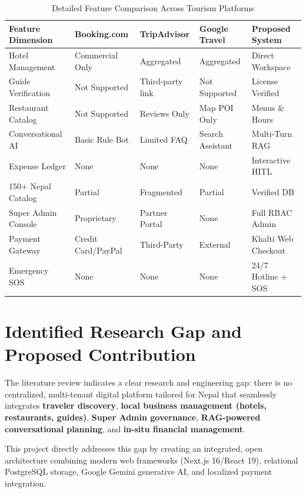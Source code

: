 \documentclass[12pt,a4paper]{report}
\begin{document}
\begin{table}[htbp]
\centering
\small
\caption{Detailed Feature Comparison Across Tourism Platforms}
\label{tab:detailed_literature_comparison}
\begin{tabularx}{\textwidth}{l X X X X}
\toprule
\textbf{Feature Dimension} & \textbf{Booking.com} & \textbf{TripAdvisor} & \textbf{Google Travel} & \textbf{Proposed System} \\
\midrule
Hotel Management & Commercial Only & Aggregated & Aggregated & Direct Workspace \\
Guide Verification & Not Supported & Third-party link & Not Supported & License Verified \\
Restaurant Catalog & Not Supported & Reviews Only & Map POI Only & Menus \& Hours \\
Conversational AI & Basic Rule Bot & Limited FAQ & Search Assistant & Multi-Turn RAG \\
Expense Ledger & None & None & None & Interactive HITL \\
150+ Nepal Catalog & Partial & Fragmented & Partial & Verified DB \\
Super Admin Console & Proprietary & Partner Portal & None & Full RBAC Admin \\
Payment Gateway & Credit Card/PayPal & Third-Party & External & Khalti Web Checkout \\
Emergency SOS & None & None & None & 24/7 Hotline + SOS \\
\bottomrule
\end{tabularx}
\end{table}

\section{Identified Research Gap and Proposed Contribution}
The literature review indicates a clear research and engineering gap: there is no centralized, multi-tenant digital platform tailored for Nepal that seamlessly integrates \textbf{traveler discovery}, \textbf{local business management (hotels, restaurants, guides)}, \textbf{Super Admin governance}, \textbf{RAG-powered conversational planning}, and \textbf{in-situ financial management}. 

This project directly addresses this gap by creating an integrated, open architecture combining modern web frameworks (Next.js 16/React 19), relational PostgreSQL storage, Google Gemini generative AI, and localized payment integration.

\end{document}
